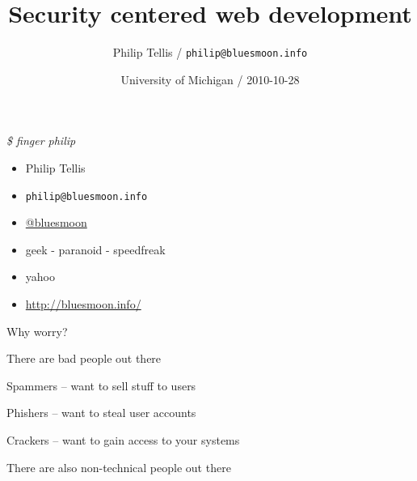 \documentclass{beamer}
\author{Philip Tellis / \texttt{philip@bluesmoon.info}}
\title{Security centered web development}
\date{University of Michigan / 2010-10-28}
\begin{document}
\begin{frame}
  \titlepage
\end{frame}


\begin{frame}{\textit{\$ finger philip}}
  \begin{itemize}
  \item Philip Tellis
  \item \small{\texttt{philip@bluesmoon.info}}
  \item \href{http://twitter.com/bluesmoon}{@bluesmoon}
  \item geek - paranoid - speedfreak
  \item yahoo
  \item \href{http://bluesmoon.info/}{http://bluesmoon.info/}
  \end{itemize}
\end{frame}


\begin{frame}{}
\begin{center}
Why worry?
\end{center}
\end{frame}

\begin{frame}{}
\begin{center}
There are bad people out there
\end{center}
\end{frame}

\begin{frame}{}
\begin{center}
Spammers -- want to sell stuff to users
\end{center}
\end{frame}

\begin{frame}{}
\begin{center}
Phishers -- want to steal user accounts
\end{center}
\end{frame}

\begin{frame}{}
\begin{center}
Crackers -- want to gain access to your systems
\end{center}
\end{frame}

\begin{frame}{}
\begin{center}
There are also non-technical people out there
\end{center}
\end{frame}
\end{document}

